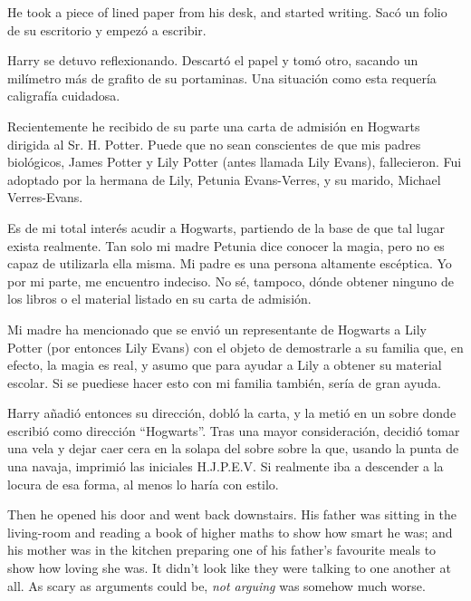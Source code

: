 He took a piece of lined paper from his desk, and started writing.
Sacó un folio de su escritorio y empezó a escribir.

\begin{writtenNote}
\end{writtenNote}

Harry se detuvo reflexionando. Descartó el papel y tomó otro, sacando un milímetro más de grafito de su portaminas. Una situación como esta requería caligrafía cuidadosa.

\begin{writtenNote}


	Recientemente he recibido de su parte una carta de admisión en Hogwarts dirigida al Sr. H. Potter. Puede que no sean conscientes de que mis padres biológicos, James Potter y Lily Potter (antes llamada Lily Evans), fallecieron. Fui adoptado por la hermana de Lily, Petunia Evans-Verres, y su marido, Michael Verres-Evans.

	Es de mi total interés acudir a Hogwarts, partiendo de la base de que tal lugar exista realmente. Tan solo mi madre Petunia dice conocer la magia, pero no es capaz de utilizarla ella misma. Mi padre es una persona altamente escéptica. Yo por mi parte, me encuentro indeciso. No sé, tampoco, dónde obtener ninguno de los libros o el material listado en su carta de admisión.

	Mi madre ha mencionado que se envió un representante de Hogwarts a Lily Potter (por entonces Lily Evans) con el objeto de demostrarle a su familia que, en efecto, la magia es real, y asumo que para ayudar a Lily a obtener su material escolar. Si se puediese hacer esto con mi familia también, sería de gran ayuda.

\end{writtenNote}

Harry añadió entonces su dirección, dobló la carta, y la metió en un sobre donde escribió como dirección ``Hogwarts''. Tras una mayor consideración, decidió tomar una vela y dejar caer cera en la solapa del sobre sobre la que, usando la punta de una navaja, imprimió las iniciales H.J.P.E.V\@. Si realmente iba a descender a la locura de esa forma, al menos lo haría con estilo.

Then he opened his door and went back downstairs. His father was sitting in the living-room and reading a book of higher maths to show how smart he was; and his mother was in the kitchen preparing one of his father’s favourite meals to show how loving she was. It didn’t look like they were talking to one another at all. As scary as arguments could be, \emph{not arguing} was somehow much worse.

